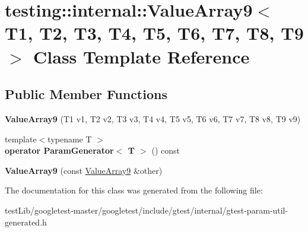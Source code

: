 \hypertarget{classtesting_1_1internal_1_1ValueArray9}{}\section{testing\+:\+:internal\+:\+:Value\+Array9$<$ T1, T2, T3, T4, T5, T6, T7, T8, T9 $>$ Class Template Reference}
\label{classtesting_1_1internal_1_1ValueArray9}
\subsection*{Public Member Functions}
\begin{DoxyCompactItemize}
\item 
\mbox{\label{classtesting_1_1internal_1_1ValueArray9_a4985545b509dc5d7db659cd31b110c21}} 
{\bfseries Value\+Array9} (T1 v1, T2 v2, T3 v3, T4 v4, T5 v5, T6 v6, T7 v7, T8 v8, T9 v9)
\item 
\mbox{\label{classtesting_1_1internal_1_1ValueArray9_aede7e5849cfab0504c49673d5c5c4cce}} 
{\footnotesize template$<$typename T $>$ }\\{\bfseries operator Param\+Generator$<$ T $>$} () const
\item 
\mbox{\label{classtesting_1_1internal_1_1ValueArray9_ab251d9c7a0df5c8034ecda38eadd030a}} 
{\bfseries Value\+Array9} (const \hyperlink{classtesting_1_1internal_1_1ValueArray9}{Value\+Array9} \&other)
\end{DoxyCompactItemize}


The documentation for this class was generated from the following file\+:\begin{DoxyCompactItemize}
\item 
test\+Lib/googletest-\/master/googletest/include/gtest/internal/gtest-\/param-\/util-\/generated.\+h\end{DoxyCompactItemize}
